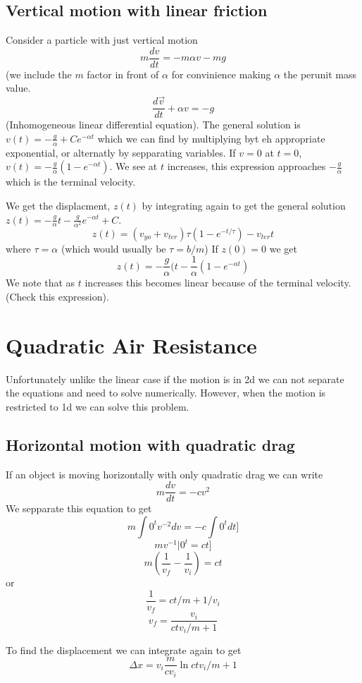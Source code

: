 \documentclass{homework}
\begin{document}
\subsection{Vertical motion with linear friction}
Consider a particle with just vertical motion
\[m\frac{dv}{dt} = -m\alpha v-m g\]
(we include the $m$ factor in front of $\alpha$ for convinience making $\alpha$ the perunit mass value.
\[\frac{d\vec {v}}{dt} +\alpha v = - g\]
(Inhomogeneous linear differential equation). The general solution is $v(t) = -\frac{g}{\alpha} + Ce^{-\alpha t}$ which we can find by multiplying byt eh appropriate exponential, or alternatly by sepparating variables. If $v = 0$ at $t = 0$, $v(t) = -\frac{g}{\alpha}(1 - e^{-\alpha t})$. We see at $t$ increases, this expression approaches $-\frac{g}{\alpha}$ which is the terminal velocity.

We get the displacment, $z(t)$  by integrating again to get the general solution $z(t) = -\frac{g}{\alpha} t - \frac{g}{\alpha^2}e^{-\alpha t} + C$. 
\[z(t) = (v_{yo}+v_{ter})\tau(1 - e^{-t/\tau}) - v_{ter}t\]
where $\tau = \alpha$ (which would usually be $\tau = b/m$)
If $z(0) = 0$ we get
\[z(t) = -\frac{g}{\alpha}(t - \frac{1}{\alpha}(1 -  e^{-\alpha t})\]
We note that as $t$ increases this becomes linear because of the terminal velocity. (Check this expression).

\section{Quadratic Air Resistance}

Unfortunately unlike the linear case if the motion is in 2d we can not separate the equations and need to solve numerically. However, when the motion is restricted to 1d we can solve this problem. 

\subsection{Horizontal motion with quadratic drag}

If an object is moving horizontally with only quadratic drag we can write
\[m\frac{dv}{dt} = -cv^2\]
We sepparate this equation to get
\[m\int{0}^{t} v^{-2}dv= -c \int{0}^{t}dt]\]
\[mv^{-1}|{0}^{t} = ct]\]
\[m(\frac{1}{v_f} - \frac{1}{v_i}) = ct\]
or
\[\frac{1}{v_f}  = ct/m + 1/v_i\]
\[v_f = \frac{v_i}{ctv_i/m + 1}\]

To find the displacement we can integrate again to get
\[\Delta x = v_i\frac{m}{cv_i}\ln{ctv_i/m + 1}\]
\end{document}
